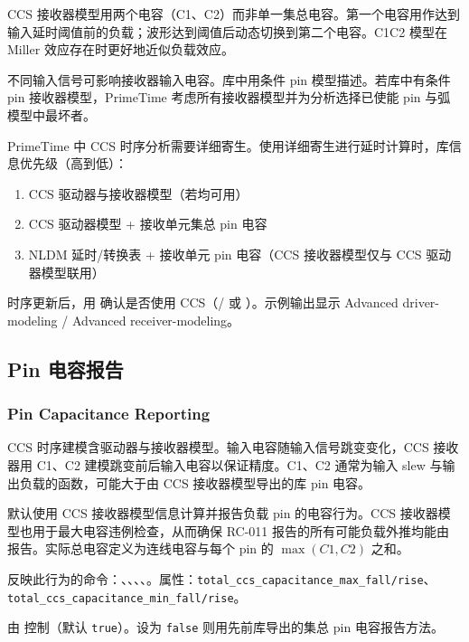 CCS 接收器模型用两个电容（C1、C2）而非单一集总电容。第一个电容用作达到输入延时阈值前的负载；波形达到阈值后动态切换到第二个电容。C1C2 模型在 Miller 效应存在时更好地近似负载效应。

不同输入信号可影响接收器输入电容。库中用条件 pin 模型描述。若库中有条件 pin 接收器模型，PrimeTime 考虑所有接收器模型并为分析选择已使能 pin 与弧模型中最坏者。

PrimeTime 中 CCS 时序分析需要详细寄生。使用详细寄生进行延时计算时，库信息优先级（高到低）：
\begin{enumerate}
  \item CCS 驱动器与接收器模型（若均可用）
  \item CCS 驱动器模型 + 接收单元集总 pin 电容
  \item NLDM 延时/转换表 + 接收单元 pin 电容（CCS 接收器模型仅与 CCS 驱动器模型联用）
\end{enumerate}

时序更新后，用  确认是否使用 CCS（/ 或 ）。示例输出显示 Advanced driver-modeling / Advanced receiver-modeling。

\subsection{Pin 电容报告}
\subsubsection*{Pin Capacitance Reporting}

CCS 时序建模含驱动器与接收器模型。输入电容随输入信号跳变变化，CCS 接收器用 C1、C2 建模跳变前后输入电容以保证精度。C1、C2 通常为输入 slew 与输出负载的函数，可能大于由 CCS 接收器模型导出的库 pin 电容。

默认使用 CCS 接收器模型信息计算并报告负载 pin 的电容行为。CCS 接收器模型也用于最大电容违例检查，从而确保 RC-011 报告的所有可能负载外推均能由  报告。实际总电容定义为连线电容与每个 pin 的 $\max(C1,C2)$ 之和。

反映此行为的命令：、、、、。属性：\texttt{total\_ccs\_capacitance\_max\_fall/rise}、\texttt{total\_ccs\_capacitance\_min\_fall/rise}。

由  控制（默认 \texttt{true}）。设为 \texttt{false} 则用先前库导出的集总 pin 电容报告方法。

